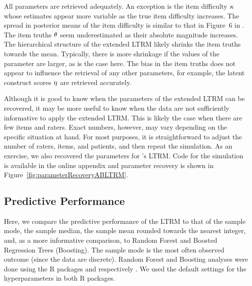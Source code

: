 \documentclass[a4paper,usenames,dvipsnames]{article}
\newenvironment{revision}{\color{teal}}{\color{black}}
\begin{document}
All parameters are retrieved adequately. An exception is the item difficulty $\kappa$ whose estimates appear more variable as the true item difficulty increases. The spread in posterior means of the item difficulty is similar to that in Figure~6 in \AB{}. The item truths $\theta$ seem underestimated as their absolute magnitude increases. The hierarchical structure of the extended LTRM likely shrinks the item truths towards the mean. Typically, there is more shrinkage if the values of the parameter are larger, as is the case here. The bias in the item truths does not appear to influence the retrieval of any other parameters, for example, the latent construct scores $\eta$ are retrieved accurately. 

Although it is good to know when the parameters of the extended LTRM can be recovered, it may be more useful to know when the data are not sufficiently informative to apply the extended LTRM. This is likely the case when there are few items and raters. Exact numbers, however, may vary depending on the specific situation at hand. For most purposes, it is straightforward to adjust the number of raters, items, and patients, and then repeat the simulation. As an exercise, we also recovered the parameters for \AB{}'s LTRM. Code for the simulation is available in the online appendix and parameter recovery is shown in Figure~\ref{fig:parameterRecoveryABLTRM}.

\subsection*{Predictive Performance}
Here, we compare the predictive performance of the LTRM to that of the sample mode\begin{revision}, the sample median, the sample mean rounded towards the nearest integer, \end{revision} and, as a more informative comparison, to Random Forest and Boosted Regression Trees (Boosting). 
The sample mode is the most often observed outcome (since the data are discrete). 
Random Forest and Boosting analyses were done using the R packages  and  respectively \cite{ranger2017, gbmPackage}. We used the default settings for the hyperparameters in both R packages.
\end{document}
